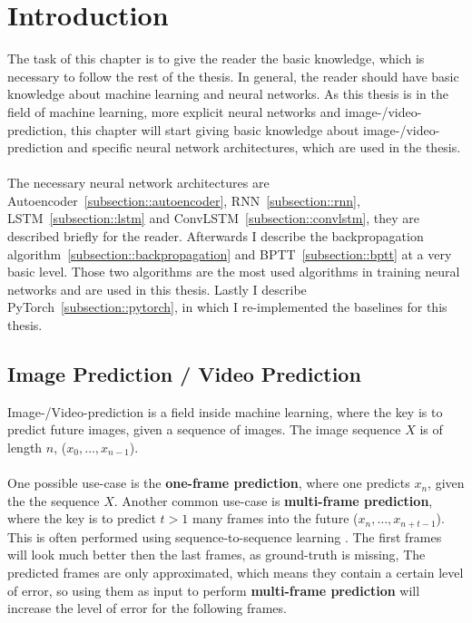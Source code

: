 \section{Introduction} \label{section::introduction}
 The task of this chapter is to give the reader the basic knowledge, which is necessary to follow the rest of the thesis. In general, the reader should have basic knowledge about machine learning
 and neural networks.
 As this thesis is in the field of machine learning, more explicit neural networks and image-/video-prediction, this chapter will start giving basic knowledge about image-/video-prediction
 and specific neural network architectures, which are used in the thesis.\\\\
 The necessary neural network architectures are Autoencoder~\ref{subsection::autoencoder}, RNN~\ref{subsection::rnn}, LSTM~\ref{subsection::lstm}
 and ConvLSTM~\ref{subsection::convlstm}, they are described briefly for the reader.
 Afterwards I describe the backpropagation algorithm~\ref{subsection::backpropagation} and BPTT~\ref{subsection::bptt} at a very basic level.
 Those two algorithms are the most used algorithms in training neural networks and are used in this thesis. Lastly I describe PyTorch~\ref{subsection::pytorch}, in which I re-implemented the baselines
 for this thesis.

 \subsection{Image Prediction / Video Prediction} \label{subsection::imageprediction}
  Image-/Video-prediction is a field inside machine learning, where the key is to predict future images, given a sequence of images. The image sequence $X$ is of length $n$, ($x_0, \ldots, x_{n-1}$).
  \\\\
  One possible use-case is the \textbf{one-frame prediction}, where one predicts $x_n$, given the the sequence $X$. Another common use-case is \textbf{multi-frame prediction}, where the key is to 
  predict $t > 1$ many frames into the future ($x_n, \ldots, x_{n+t-1}$).
  This is often performed using sequence-to-sequence learning \cite{Sutskever2014}. The first frames will look much better then the last frames, as 
  ground-truth is missing, The predicted frames are only approximated, which means they contain a certain level of error, so using them as input to perform \textbf{multi-frame prediction} will
  increase the level of error for the following frames.

